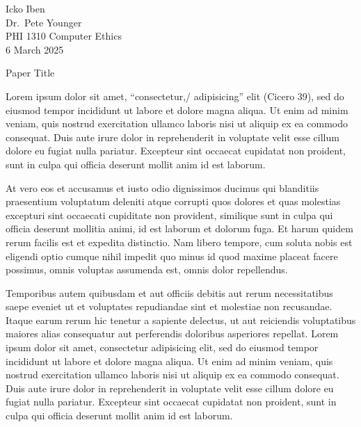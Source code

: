 \documentclass[12pt]{article}
\begin{document}
\begin{flushleft}

	Icko Iben\\
	Dr.\ Pete Younger\\
	PHI 1310 Computer Ethics\\
	6 March 2025\\

	\begin{center}
		Paper Title
	\end{center}

	\setlength{\parindent}{0.5in}

	Lorem ipsum dolor sit amet, ``consectetur,/ adipisicing'' elit (Cicero 39), sed
	do eiusmod tempor incididunt ut labore et dolore magna aliqua. Ut enim ad
	minim veniam, quis nostrud exercitation ullamco laboris nisi ut aliquip ex
	ea commodo consequat. Duis aute irure dolor in reprehenderit in voluptate
	velit esse cillum dolore eu fugiat nulla pariatur. Excepteur sint occaecat
	cupidatat non proident, sunt in culpa qui officia deserunt mollit anim id
	est laborum.

	At vero eos et accusamus\footnotemark{} et iusto odio dignissimos ducimus qui
	blanditiis praesentium voluptatum deleniti atque corrupti quos dolores et
	quas molestias excepturi sint occaecati cupiditate non provident, similique
	sunt in culpa qui officia deserunt mollitia animi, id est laborum et
	dolorum fuga. Et harum quidem rerum facilis est et expedita distinctio. Nam
	libero tempore, cum soluta nobis est eligendi optio cumque nihil impedit
	quo minus id quod maxime placeat facere possimus, omnis voluptas assumenda
	est, omnis dolor repellendus.

	Temporibus autem quibusdam et aut officiis debitis aut rerum necessitatibus
	saepe eveniet ut et voluptates repudiandae sint et molestiae non
	recusandae. Itaque earum rerum hic tenetur a sapiente delectus, ut aut
	reiciendis voluptatibus maiores alias consequatur aut perferendis doloribus
	asperiores repellat. Lorem ipsum dolor sit amet, consectetur adipisicing
	elit, sed do eiusmod tempor incididunt ut labore et dolore magna aliqua. Ut
	enim ad minim veniam, quis nostrud exercitation ullamco laboris nisi ut
	aliquip ex ea commodo consequat. Duis aute irure dolor in reprehenderit in
	voluptate velit esse cillum dolore eu fugiat nulla pariatur. Excepteur sint
	occaecat cupidatat non proident, sunt in culpa qui officia deserunt mollit
	anim id est laborum.


\end{flushleft}
\end{document}
